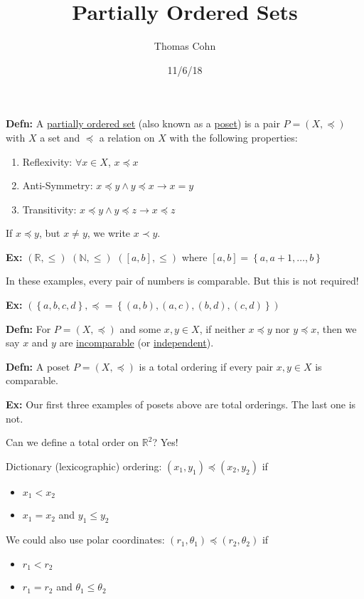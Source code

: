 \documentclass[10pt,letterpaper]{article}
\author{Thomas Cohn}
\title{Partially Ordered Sets}
\date{11/6/18} %
\newcommand{\n}{\hfill\break}
\newcommand{\defn}[1]{\par\noindent\settowidth{\hangindent}{\textbf{Defn: }}\textbf{Defn: }#1\n}
\newcommand{\ex}[1]{\par\noindent\settowidth{\hangindent}{\textbf{Ex: }}\textbf{Ex: }#1\n}
\newcommand{\set}[1]{\left\{#1\right\}}
\newcommand{\naturals}{\mathbb{N}}
\newcommand{\N}{\naturals}
\newcommand{\reals}{\mathbb{R}}
\newcommand{\R}{\reals}
\begin{document}
\maketitle
\setlength\RaggedRightParindent{\parindent}
\RaggedRight

\defn{A \underline{partially ordered set} (also known as a \underline{poset}) is a pair $P=(X,\preceq)$ with $X$ a set and $\preceq$ a relation on $X$ with the following properties:
\begin{enumerate}
	\item Reflexivity: $\forall{}x\in{}X$, $x\preceq{}x$
	\item Anti-Symmetry: $x\preceq{}y\land{}y\preceq{}x\to{}x=y$
	\item Transitivity: $x\preceq{}y\land{}y\preceq{}z\to{}x\preceq{}z$
\end{enumerate}
If $x\preceq{}y$, but $x\ne{}y$, we write $x\prec{}y$.}

\ex{$(\R,\le)$\n
$(\N,\le)$\n
$([a,b],\le)$ where $[a,b]=\set{a,a+1,\ldots,b}$}

\par\noindent In these examples, every pair of numbers is comparable. But this is not required!\n

\ex{$(\set{a,b,c,d},\preceq=\set{(a,b),(a,c),(b,d),(c,d)})$}

\defn{For $P=(X,\preceq)$ and some $x,y\in{}X$, if neither $x\preceq{}y$ nor $y\preceq{}x$, then we say $x$ and $y$ are \underline{incomparable} (or \underline{independent}).}

\defn{A poset $P=(X,\preceq)$ is a total ordering if every pair $x,y\in{}X$ is comparable.}

\ex{Our first three examples of posets above are total orderings. The last one is not.}

\par\noindent Can we define a total order on $\R^{2}$? Yes!

\par\noindent Dictionary (lexicographic) ordering:\n
$(x_{1},y_{1})\preceq(x_{2},y_{2})$ if
\begin{itemize}
	\item $x_{1}<x_{2}$
	\item $x_{1}=x_{2}$ and $y_{1}\le{}y_{2}$
\end{itemize}

\par\noindent We could also use polar coordinates:\n
$(r_{1},\theta_{1})\preceq(r_{2},\theta_{2})$ if
\begin{itemize}
	\item $r_{1}<r_{2}$
	\item $r_{1}=r_{2}$ and $\theta_{1}\le\theta_{2}$
\end{itemize}
\end{document}
